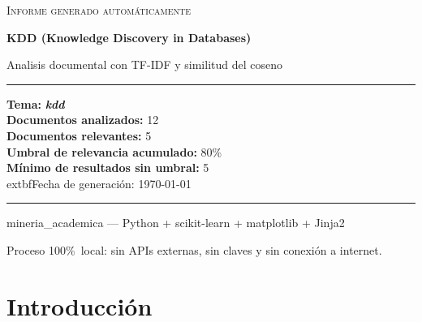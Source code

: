 \documentclass[11pt,a4paper]{article}
\newcommand{\tema}[1]{\textbf{\textit{#1}}}
\newcommand{\pcento}{\%}
\begin{document}
\begin{titlepage}
  \centering
  \vspace*{2.0cm}

  {\Large\textsc{Informe generado automáticamente}\par}
  \vspace{0.7cm}
  {\huge\bfseries KDD (Knowledge Discovery in Databases)\par}
  \vspace{0.4cm}
  {\large Analisis documental con TF-IDF y similitud del coseno\par}

  \vspace{1.8cm}

  \begin{minipage}{0.92\textwidth}
    \hrule
    \vspace{0.4cm}
    {\small
    \textbf{Tema:} \tema{ kdd }\\[4pt]
    \textbf{Documentos analizados:} 12\\
    \textbf{Documentos relevantes:} 5\\
    \textbf{Umbral de relevancia acumulado:} 80\pcento\\
    \textbf{Mínimo de resultados sin umbral:} 5\\
      	extbf{Fecha de generación:} \today
    \par}
    \vspace{0.4cm}
    \hrule
  \end{minipage}

  \vfill

  {\small mineria\_academica --- Python + scikit-learn + matplotlib + Jinja2\par}
  {\footnotesize
   Proceso 100\pcento\ local: sin APIs externas, sin claves y sin conexión
   a internet.\par}
\end{titlepage}

\tableofcontents
\newpage

\section{Introducción}
\label{sec:introduccion}
\end{document}
